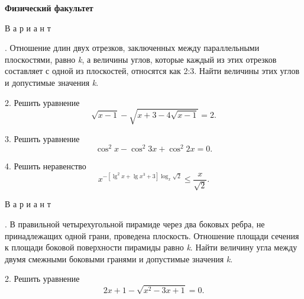\begin{minipage}[bs]{0.45\textwidth}
\begin{minipage}[bs]{\textwidth}
\textbf{Физический факультет}

\qquad В а р и а н т

. Отношение длин двух отрезков, заключенных между параллельными плоскостями, равно \textit{k}, а величины углов, которые каждый из этих отрезков составляет с одной из плоскостей, относятся как 2:3. Найти величины этих углов и допустимые значения \textit{k}.
\end{minipage}

\qquad \raggedright{2. Решить уравнение}
$$\sqrt{x - 1} - \sqrt{x + 3 - 4\sqrt{x - 1}} = 2.$$
\qquad \raggedright{3. Решить уравнение}
$$\cos^{2}x - \cos^{2}3x + \cos^{2}2x = 0.$$
\qquad  \raggedright{4. Решить неравенство}
$$x^{-[\lg^{2}x + \lg x^{3} + 3] \log_{x}\sqrt{2}} \le \frac{x}{\sqrt{2}}.$$
\begin{minipage}[bs]{\textwidth}
\qquad В а р и а н т

. В правильной четырехугольной пирамиде через два боковых ребра, не принадлежащих одной грани, проведена плоскость. Отношение площади сечения к площади боковой поверхности пирамиды равно \textit{k}. Найти величину угла между двумя смежными боковыми гранями и допустимые значения \textit{k}.

\qquad \raggedright{2. Решить уравнение\\}
$$2x + 1 - \sqrt{x^{2} - 3x + 1} = 0.$$
\end{minipage}
\end{minipage}

